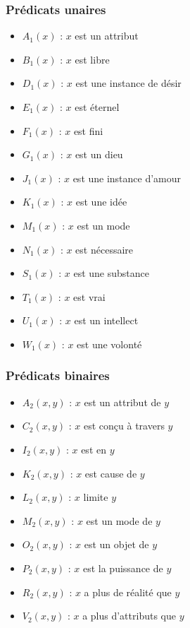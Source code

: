 \documentclass[10pt,a3paper]{article}
\begin{document}
\subsubsection{Prédicats unaires}
\begin{itemize}
    \item $A_1(x)$ : $x$ est un attribut
    \item $B_1(x)$ : $x$ est libre
    \item $D_1(x)$ : $x$ est une instance de désir
    \item $E_1(x)$ : $x$ est éternel
    \item $F_1(x)$ : $x$ est fini
    \item $G_1(x)$ : $x$ est un dieu
    \item $J_1(x)$ : $x$ est une instance d'amour
    \item $K_1(x)$ : $x$ est une idée
    \item $M_1(x)$ : $x$ est un mode
    \item $N_1(x)$ : $x$ est nécessaire
    \item $S_1(x)$ : $x$ est une substance
    \item $T_1(x)$ : $x$ est vrai
    \item $U_1(x)$ : $x$ est un intellect
    \item $W_1(x)$ : $x$ est une volonté
\end{itemize}

\subsubsection{Prédicats binaires}
\begin{itemize}
    \item $A_2(x,y)$ : $x$ est un attribut de $y$
    \item $C_2(x,y)$ : $x$ est conçu à travers $y$
    \item $I_2(x,y)$ : $x$ est en $y$
    \item $K_2(x,y)$ : $x$ est cause de $y$
    \item $L_2(x,y)$ : $x$ limite $y$
    \item $M_2(x,y)$ : $x$ est un mode de $y$
    \item $O_2(x,y)$ : $x$ est un objet de $y$
    \item $P_2(x,y)$ : $x$ est la puissance de $y$
    \item $R_2(x,y)$ : $x$ a plus de réalité que $y$
    \item $V_2(x,y)$ : $x$ a plus d'attributs que $y$
\end{itemize}
\end{document}
